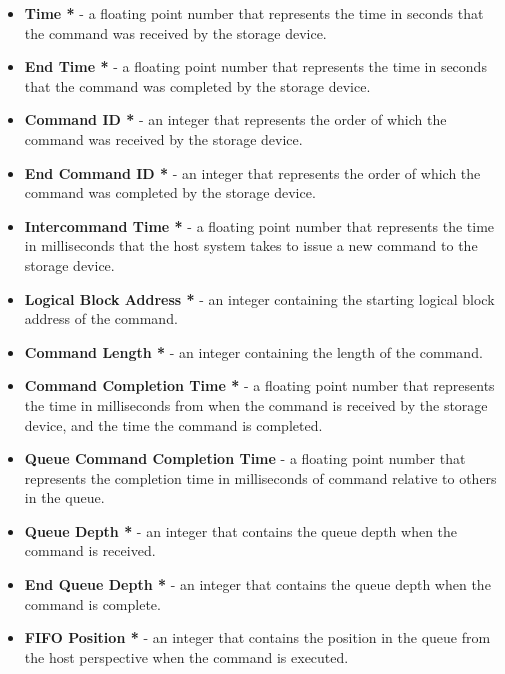 \documentclass[journal]{vgtc}                %
\begin{document}
\begin{itemize}
\item \textbf{Time *} - a floating point number that represents the time in seconds that the command was received by the storage device.

\item \textbf{End Time *} - a floating point number that represents the time in seconds that the command was completed by the storage device.

\item \textbf{Command ID *} - an integer that represents the order of which the command was received by the storage device.

\item \textbf{End Command ID *} - an integer that represents the order of which the command was completed by the storage device.

\item \textbf{Intercommand Time *} - a floating point number that represents the time in milliseconds that the host system takes to issue a new command to the storage device.

\item \textbf{Logical Block Address *} - an integer containing the starting logical block address of the command.

\item \textbf{Command Length *} - an integer containing the length of the command.

\item \textbf{Command Completion Time *} - a floating point number that represents the time in milliseconds from when the command is received by the storage device, and the time the command is completed.

\item \textbf{Queue Command Completion Time} - a floating point number that represents the completion time in milliseconds of command relative to others in the queue.

\item \textbf{Queue Depth *} - an integer that contains the queue depth when the command is received.

\item \textbf{End Queue Depth *} - an integer that contains the queue depth when the command is complete.

\item \textbf{FIFO Position *} - an integer that contains the position in the queue from the host perspective when the command is executed.


\end{itemize}
\end{document}
